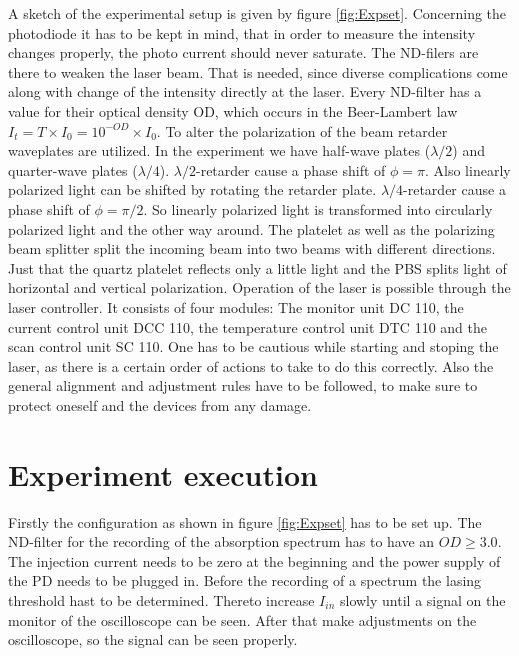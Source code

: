 \noindent
A sketch of the experimental setup is given by figure \ref{fig:Expset}. Concerning the photodiode it has to be kept in mind, that in order to measure the intensity changes properly, the photo current should never saturate. The ND-filers are there to weaken the laser beam. That is needed, since diverse complications come along with change of the intensity directly at the laser. Every ND-filter has a value for their optical density OD, which occurs in the Beer-Lambert law $I_{t}=T\times I_{0}=10^{-OD}\times I_{0}$. To alter the polarization of the beam retarder waveplates are utilized. In the experiment we have half-wave plates ($\lambda/2$) and quarter-wave plates ($\lambda/4$). $\lambda/2$-retarder cause a phase shift of $\phi=\pi$. Also linearly polarized light can be shifted by rotating the retarder plate. $\lambda/4$-retarder cause a phase shift of $\phi=\pi/2$. So linearly polarized light is transformed into circularly polarized light and the other way around. The platelet as well as the polarizing beam splitter split the incoming beam into two beams with different directions. Just that the quartz platelet reflects only a little light and the PBS splits light of horizontal and vertical polarization. Operation of the laser is possible through the laser controller. It consists of four modules: The monitor unit DC 110, the current control unit DCC 110, the temperature control unit DTC 110 and the scan control unit SC 110. One has to be cautious while starting and stoping the laser, as there is a certain order of actions to take to do this correctly. Also the general alignment and adjustment rules have to be followed, to make sure to protect oneself and the devices from any damage. 

\chapter{Experiment execution}

Firstly the configuration as shown in figure \ref{fig:Expset} has to be set up. The ND-filter for the recording of the absorption spectrum has to have an $OD\geq 3.0$. The injection current needs to be zero at the beginning and the power supply of the PD needs to be plugged in. Before the recording of a spectrum the lasing threshold hast to be determined. Thereto increase $I_{in}$ slowly until a signal on the monitor of the oscilloscope can be seen. After that make adjustments on the oscilloscope, so the signal can be seen properly. 

